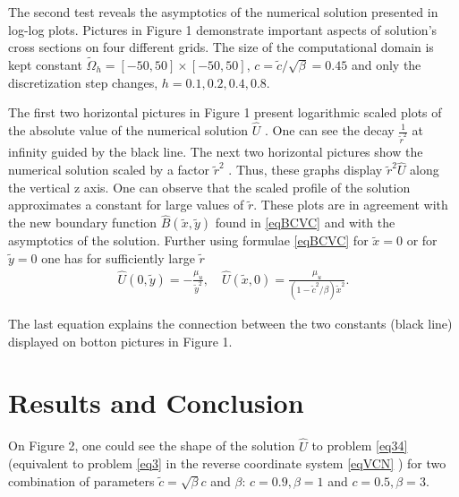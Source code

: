 \documentclass[12pt]{article}
\theoremstyle{theorem}
\theoremstyle{defi}
\begin{document}
The second test reveals the asymptotics of the numerical solution presented in log-log plots. Pictures in Figure 1 demonstrate important aspects of solution's cross sections on four different grids. The size of the computational domain is kept constant  $\tilde \Omega_h = [-50, 50]\times[-50, 50]$, $c = \tilde c / \sqrt \beta = 0.45$ and only the discretization step changes, $h = 0.1, 0.2, 0.4, 0.8$. 

The first two horizontal pictures in Figure 1 present logarithmic scaled plots of the absolute value of the numerical solution $\widehat{U}$  . One can see the decay $\frac{1}{\tilde r^2}$  at infinity guided by the black line. The next two horizontal pictures show the numerical solution scaled by a factor $\tilde r^2$  . Thus, these graphs display  $\tilde r^2\widehat{U}$  along the vertical z axis. One can observe that the scaled profile of the solution approximates a constant for large values of $ \tilde r$.  These plots are in agreement with the new boundary function $\widehat B(\tilde{x} , \tilde y)$ found in \eqref{eqBCVC} and with the asymptotics of the solution. Further using formulae \eqref{eqBCVC}  for $\tilde x = 0$ or for $\tilde y = 0$ one has for sufficiently large $ \tilde r $
\begin{equation}\label{eqCross}
\begin{split}
\widehat{U}(0,\tilde y) = - \frac{\mu_u}{\tilde y^2}, \quad \widehat{U}(\tilde x,0) = \frac{\mu_u}{(1 - \tilde c^2/\beta )\tilde x^2}.
\end{split}
\end{equation}

The last equation explains the connection between the two constants (black line) displayed on botton pictures in Figure 1.


\section{Results and Conclusion}

On Figure 2, one could see the shape of the solution $\widehat U$ to problem  \eqref{eq34} (equivalent to problem \eqref{eq3} in the reverse coordinate system \eqref{eqVCN}  ) for two combination of parameters $\tilde  c = \sqrt \beta c$ and $\beta$:
$c = 0.9, \beta = 1$ and $c = 0.5, \beta = 3$.
\end{document}
